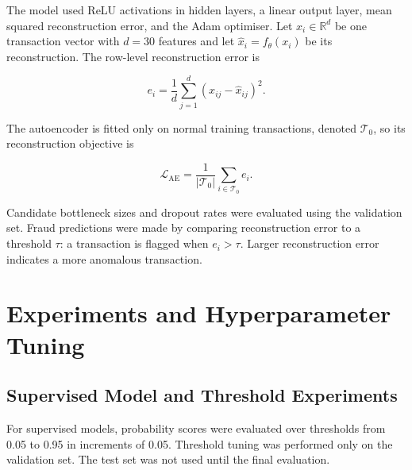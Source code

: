 \documentclass[12pt,a4paper]{report}
\begin{document}
The model used ReLU activations in hidden layers, a linear output layer, mean squared reconstruction error, and the Adam optimiser. Let $x_i \in \mathbb{R}^{d}$ be one transaction vector with $d=30$ features and let $\hat{x}_i=f_{\theta}(x_i)$ be its reconstruction. The row-level reconstruction error is

\begin{equation}
    e_i = \frac{1}{d}\sum_{j=1}^{d}(x_{ij}-\hat{x}_{ij})^2.
\end{equation}

The autoencoder is fitted only on normal training transactions, denoted $\mathcal{T}_0$, so its reconstruction objective is

\begin{equation}
    \mathcal{L}_{\mathrm{AE}}
    = \frac{1}{|\mathcal{T}_0|}\sum_{i \in \mathcal{T}_0} e_i.
\end{equation}

Candidate bottleneck sizes and dropout rates were evaluated using the validation set. Fraud predictions were made by comparing reconstruction error to a threshold $\tau$: a transaction is flagged when $e_i > \tau$. Larger reconstruction error indicates a more anomalous transaction.

\chapter{Experiments and Hyperparameter Tuning}

\section{Supervised Model and Threshold Experiments}

For supervised models, probability scores were evaluated over thresholds from 0.05 to 0.95 in increments of 0.05. Threshold tuning was performed only on the validation set. The test set was not used until the final evaluation.

\begin{table}[htbp]
    \centering
    \caption{Best validation result for each supervised model after threshold tuning.}
\end{table}
\end{document}
